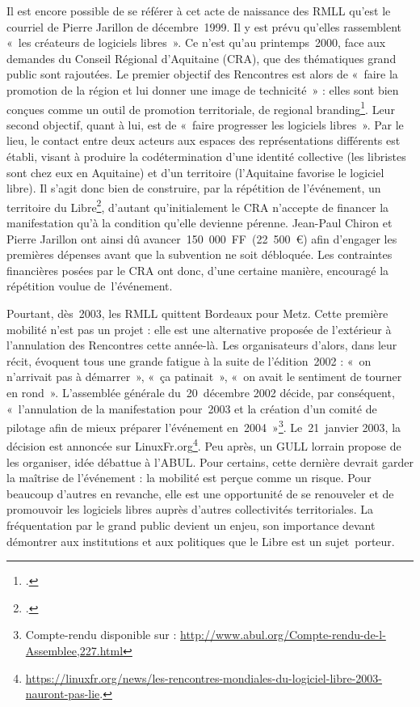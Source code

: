 \documentclass{FramateX}
\begin{document}
\begin{refsection}
Il est encore possible de se référer à cet acte de naissance des RMLL
qu'est le courriel de Pierre Jarillon de décembre~1999. Il y est prévu
qu'elles rassemblent «~les créateurs de logiciels
libres~». Ce n'est qu'au printemps~2000, face aux demandes du Conseil
Régional d'Aquitaine (CRA), que des thématiques grand public sont
rajoutées. Le premier objectif des Rencontres est alors de
«~faire la promotion de la région et lui donner une
image de technicité~» : elles sont bien conçues comme un outil de
promotion territoriale, de regional
branding\footnote{\cite{hospersplace2004}.}. Leur second objectif, quant à lui, est de
«~faire progresser les logiciels libres~». Par le
lieu, le contact entre deux acteurs aux espaces des représentations
différents est établi, visant à produire la codétermination d'une
identité collective (les libristes sont chez eux en Aquitaine) et d'un
territoire (l'Aquitaine favorise le logiciel libre). Il s'agit donc
bien de construire, par la répétition de l'événement, un territoire du
Libre\footnote{\cite{giraudles2010}.}, d'autant qu'initialement le CRA n'accepte de financer la
manifestation qu'à la condition qu'elle devienne pérenne. Jean-Paul
Chiron et Pierre Jarillon ont ainsi dû avancer~150~000~FF~(22~500~€)
afin d'engager les premières dépenses avant que la subvention ne soit
débloquée. Les contraintes financières posées par le CRA ont donc,
d'une certaine manière, encouragé la répétition voulue de~l'événement.

Pourtant, dès~2003, les RMLL quittent Bordeaux pour Metz. Cette première
mobilité n'est pas un projet : elle est une alternative proposée de
l'extérieur à l'annulation des Rencontres cette année-là. Les
organisateurs d'alors, dans leur récit, évoquent tous une grande
fatigue à la suite de l'édition~2002 : «~on
n'arrivait pas à démarrer~», «~ça patinait~»,
«~on avait le sentiment de tourner en rond~».
L'assemblée générale du~20~décembre 2002 décide, par conséquent,
«~l'annulation de la manifestation pour~2003 et la
création d'un comité de pilotage afin de mieux préparer l'événement
en~2004~»\footnote{Compte-rendu disponible sur :
\url{http://www.abul.org/Compte-rendu-de-l-Assemblee,227.html} }.
Le~21~janvier 2003, la décision est annoncée sur
LinuxFr.org\footnote{\url{https://linuxfr.org/news/les-rencontres-mondiales-du-logiciel-libre-2003-nauront-pas-lie}.}. Peu après, un GULL lorrain propose de les organiser, idée débattue à
l'ABUL. Pour certains, cette dernière devrait garder la maîtrise de
l'événement : la mobilité est perçue comme un risque. Pour beaucoup
d'autres en revanche, elle est une opportunité de se renouveler et de
promouvoir les logiciels libres auprès d'autres collectivités
territoriales. La fréquentation par le grand public devient un enjeu,
son importance devant démontrer aux institutions et aux politiques que
le Libre est un sujet~porteur.


\end{refsection}
\end{document}
